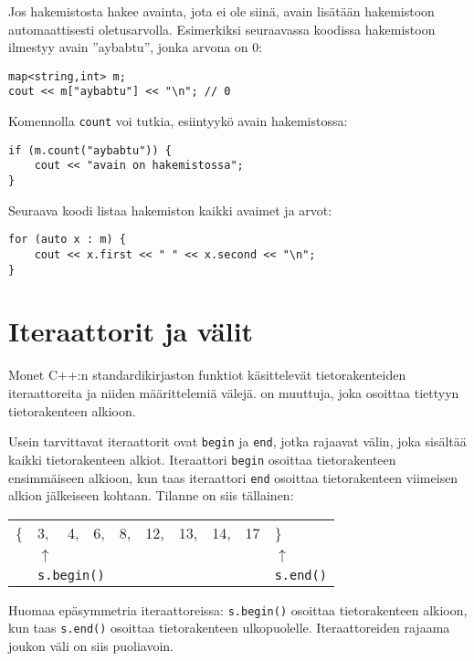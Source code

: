 Jos hakemistosta hakee avainta,
jota ei ole siinä,
avain lisätään hakemistoon
automaattisesti oletusarvolla.
Esimerkiksi seuraavassa koodissa
hakemistoon ilmestyy avain ''aybabtu'',
jonka arvona on 0:

\begin{lstlisting}
map<string,int> m;
cout << m["aybabtu"] << "\n"; // 0
\end{lstlisting}

Komennolla \texttt{count} voi
tutkia, esiintyykö avain hakemistossa:

\begin{lstlisting}
if (m.count("aybabtu")) {
    cout << "avain on hakemistossa";
}
\end{lstlisting}

Seuraava koodi listaa hakemiston
kaikki avaimet ja arvot:

\begin{lstlisting}
for (auto x : m) {
    cout << x.first << " " << x.second << "\n";
}
\end{lstlisting}

\section{Iteraattorit ja välit}


Monet C++:n standardikirjaston funktiot
käsittelevät tietorakenteiden iteraattoreita
ja niiden määrittelemiä välejä.
 on muuttuja,
joka osoittaa tiettyyn tietorakenteen alkioon.

Usein tarvittavat iteraattorit ovat \texttt{begin}
ja \texttt{end}, jotka rajaavat välin,
joka sisältää kaikki tietorakenteen alkiot.
Iteraattori \texttt{begin} osoittaa
tietorakenteen ensimmäiseen alkioon,
kun taas iteraattori \texttt{end} osoittaa
tietorakenteen viimeisen alkion jälkeiseen kohtaan.
Tilanne on siis tällainen:

\begin{center}
\begin{tabular}{llllllllll}
\{ & 3, & 4, & 6, & 8, & 12, & 13, & 14, & 17 & \} \\
& $\uparrow$ & & & & & & & & $\uparrow$ \\
& \multicolumn{3}{l}{\texttt{s.begin()}} & & & & & & \texttt{s.end()} \\
\end{tabular}
\end{center}

Huomaa epäsymmetria iteraattoreissa:
\texttt{s.begin()} osoittaa tietorakenteen alkioon,
kun taas \texttt{s.end()} osoittaa tietorakenteen ulkopuolelle.
Iteraattoreiden rajaama joukon väli on siis puoliavoin.


